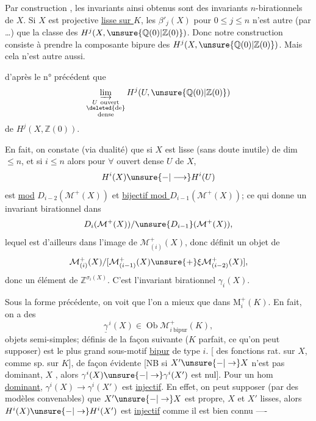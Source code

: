Par construction , les invariants
ainsi obtenus sont des invariants
$n$-birationnels de $X$. Si $X$ est projective
\uline{lisse sur $K$}, les $\beta'_j(X)$ pour $0\leq j\leq n$
n'est autre (par \ldots) que
la classe des $H^j(X,\unsure{\mathbb{Q}(0)|\mathbb{Z}(0)})$. Donc notre construction
consiste à prendre la composante bipure des
$H^j(X,\unsure{\mathbb{Q}(0)|\mathbb{Z}(0)})$. Mais cela n'est autre aussi.

d'après le n° précédent que 
\[
\varinjlim_{\substack{U\ \mathrm{ouvert}\\ \deleted{\mathrm{de}}\\ \mathrm{dense}}}
H^j(U,\unsure{\mathbb{Q}(0)|\mathbb{Z}(0)})
\]
de $H^j(X,\mathbb{Z}(0))$.

En fait, on constate (via dualité)
que si $X$ est lisse (sans doute
inutile) de dim $\leq n$, et si $i\leq n$
alors pour $\forall$ ouvert dense $U$ de $X$,
\[
H^i(X)\unsure{-|\longrightarrow}H^i(U)
\]
est \uline{ mod}
$D_{i-2}(\mathcal{M}^{+}(X))$ et
\uline{bijectif mod $D_{i-1}(\mathcal{M}^{+}(X))$}; ce qui
donne un invariant birationnel dans
\[
D_i(\mathcal{M}^{+}(X))/\unsure{D_{i-1}}(\mathcal{M}^{+}(X)),
\]
lequel
est d'ailleurs dans l'image de
$\mathcal{M}^{+}_{(i)}(X)$, donc définit un objet de
\[
\mathcal{M}^{+}_{(i)}(X)/
[\mathcal{M}^{+}_{(i-1)}(X)\unsure{+}\xi\mathcal{M}^{+}_{(i-2)}(X)],
\]
donc un
élément de $\mathbb{Z}^{\sigma_i(X)}$. C'est
l'invariant birationnel $\gamma_i(X)$.

Sous la forme précédente, on voit que
l'on a mieux que  
dans $\mathrm{M}^{+}_i(K)$. En fait, on a des
\[
\underline{\gamma}^{\,i}(X)\in
\operatorname{Ob}\mathcal{M}^{+}_{i\ \mathrm{bipur}}(K),
\]
objets semi-simples;
définis de la façon suivante ($K$ parfait,
ce qu'on peut supposer)
est le plus grand sous-motif \uline{bipur} de
type $i$.
\deleted{[Ainsi le foncteur $\unsure{\gamma^i(X)}$}
[  des fonctions rat. sur $X$,
comme sp. sur $K$], de façon évidente
[NB si $X'\unsure{-|\to}X$ n'est pas dominant,
$X$ , alors
$\gamma^i(X)\unsure{-|\to}\gamma^i(X')$ est
nul]. Pour un hom \uline{dominant},
$\gamma^i(X)\to\gamma^i(X')$ est \uline{injectif}. En effet,
on peut supposer (par des modèles convenables)
que $X'\unsure{-|\to}X$ est propre, 
$X$ et $X'$ lisses,
alors $H^i(X)\unsure{-|\to}H^i(X')$ est \uline{injectif} comme
il est bien connu ----


